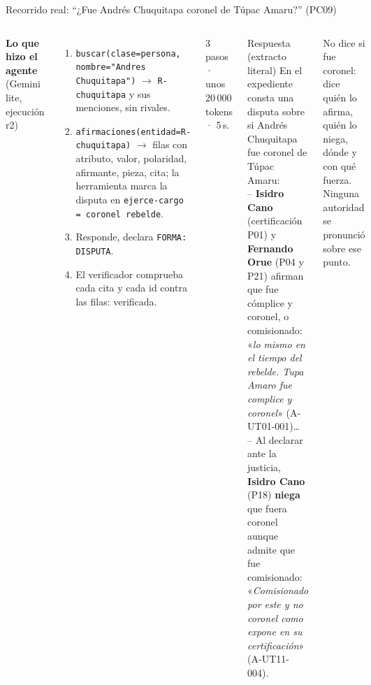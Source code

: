 \documentclass[aspectratio=169,10pt]{beamer}
\newcommand{\cita}[1]{«\textit{#1}»}
\newcommand{\ttt}[1]{\texttt{\small #1}}
\begin{document}
\begin{frame}{Recorrido real: \enquote{¿Fue Andrés Chuquitapa coronel de Túpac Amaru?} (PC09)}
\begin{columns}[T]
\footnotesize
\textbf{Lo que hizo el agente} (Gemini lite, ejecución r2)
\begin{enumerate}
\item \ttt{buscar(clase=persona, nombre="Andres Chuquitapa")} $\to$ \ttt{R-chuquitapa} y sus menciones, sin rivales.
\item \ttt{afirmaciones(entidad=R-chuquitapa)} $\to$ filas con atributo, valor, polaridad, afirmante, pieza, cita; la
      herramienta marca la disputa en \ttt{ejerce-cargo = coronel rebelde}.
\item Responde, declara \ttt{FORMA: DISPUTA}.
\item El verificador comprueba cada cita y cada id contra las filas: \alert{verificada}.
\end{enumerate}
3 pasos · unos 20\,000 tokens · 5\,s.
\scriptsize
\begin{block}{Respuesta (extracto literal)}
En el expediente consta una disputa sobre si Andrés Chuquitapa fue coronel de Túpac Amaru:\\
-- \textbf{Isidro Cano} (certificación P01) y \textbf{Fernando Orue} (P04 y P21) afirman que fue cómplice y coronel, o
comisionado: \cita{lo mismo en el tiempo del rebelde. Tupa Amaro fue complice y coronel} (A-UT01-001)…\\
-- Al declarar ante la justicia, \textbf{Isidro Cano} (P18) \textbf{niega} que fuera coronel aunque admite que fue
comisionado: \cita{Comisionado por este y no coronel como expone en su certificación} (A-UT11-004).
\end{block}
\footnotesize No dice si fue coronel: dice \alert{quién lo afirma, quién lo niega, dónde y con qué fuerza}. Ninguna
autoridad se pronunció sobre ese punto.
\end{columns}
\end{frame}
\end{document}
